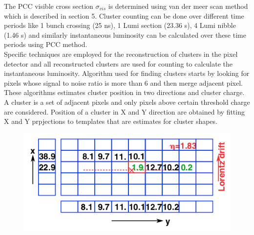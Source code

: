 The PCC visible cross section $\sigma_{vis}$ is determined using van der meer scan method which is described in section 5. Cluster counting can be done over different time periods like 1 bunch crossing (25 ns), 1 Lumi section (23.36 s), 4 Lumi nibble (1.46 s) and similarly instantaneous luminosity can be calculated over these time periods using PCC method. \\

Specific techniques are employed for the reconstruction of clusters in the pixel detector and all reconstructed clusters are used for counting to calculate the instantaneous luminosity. Algorithm used for finding clusters starts by looking for pixels whose signal to noise ratio is more than 6 and then merge adjacent pixel. These algorithms estimates cluster position in two directions and cluster charge. A cluster is a set of adjacent pixels and only pixels above certain threshold charge are considered. Position of a cluster in X and Y direction are obtained by fitting X and Y prpjections to templates that are estimates for cluster shapes.


\begin{figure}[H]
  \centering
  \includegraphics[width=0.6\columnwidth]{./pixel_reco.png}
  \caption{ \onehalfspacing }
  \label{fig:CMS}
\end{figure}








